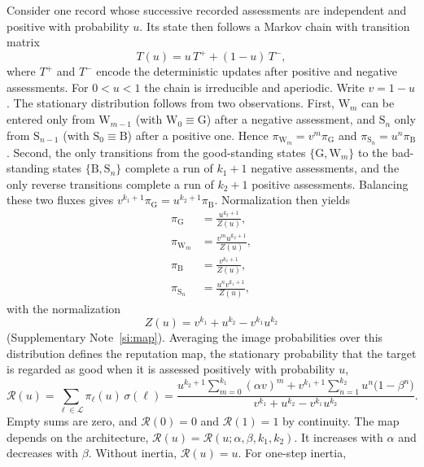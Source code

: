 \documentclass[10pt]{wlscirep}
\newcommand{\Rmap}{\mathscr{R}}            %
\newcommand{\Lspace}{\mathscr{L}}          %
\newcommand{\st}[1]{\mathrm{#1}}           %
\theoremstyle{plain}
\theoremstyle{remark}
\begin{document}
Consider one record whose successive recorded assessments are independent and positive with probability $u$. Its state then follows a Markov chain with transition matrix
\begin{equation}
T(u)=u\,T^{+}+(1-u)\,T^{-},
\label{eq:m-chain}
\end{equation}
where $T^+$ and $T^-$ encode the deterministic updates after positive and negative assessments. For $0<u<1$ the chain is irreducible and aperiodic. Write $v=1-u$. The stationary distribution follows from two observations. First, $\st W_m$ can be entered only from $\st W_{m-1}$ (with $\st W_0\equiv\st G$) after a negative assessment, and $\st S_n$ only from $\st S_{n-1}$ (with $\st S_0\equiv\st B$) after a positive one. Hence $\pi_{\st W_m}=v^m\pi_{\st G}$ and $\pi_{\st S_n}=u^n\pi_{\st B}$. Second, the only transitions from the good-standing states $\{\st G,\st W_m\}$ to the bad-standing states $\{\st B,\st S_n\}$ complete a run of $k_1+1$ negative assessments, and the only reverse transitions complete a run of $k_2+1$ positive assessments. Balancing these two fluxes gives $v^{k_1+1}\pi_{\st G}=u^{k_2+1}\pi_{\st B}$. Normalization then yields
\begin{equation}
\begin{aligned}
\pi_{\st G}&=\frac{u^{k_2+1}}{Z(u)},\\[2pt]
\pi_{\st W_m}&=\frac{v^{m}u^{k_2+1}}{Z(u)},\\[2pt]
\pi_{\st B}&=\frac{v^{k_1+1}}{Z(u)},\\[2pt]
\pi_{\st S_n}&=\frac{u^{n}v^{k_1+1}}{Z(u)},
\end{aligned}
\label{eq:m-stationary}
\end{equation}
with the normalization
\begin{equation}
Z(u)=v^{k_1}+u^{k_2}-v^{k_1}u^{k_2}
\label{eq:m-Z}
\end{equation}
(Supplementary Note~\ref{si:map}). Averaging the image probabilities over this distribution defines the reputation map, the stationary probability that the target is regarded as good when it is assessed positively with probability $u$,
\begin{equation}
\Rmap(u)=\sum_{\ell\in\Lspace}\pi_\ell(u)\,\sigma(\ell)
=\frac{u^{k_2+1}\sum_{m=0}^{k_1}(\alpha v)^m+v^{k_1+1}\sum_{n=1}^{k_2}u^n\bigl(1-\beta^n\bigr)}{v^{k_1}+u^{k_2}-v^{k_1}u^{k_2}}.
\label{eq:m-map}
\end{equation}
Empty sums are zero, and $\Rmap(0)=0$ and $\Rmap(1)=1$ by continuity. The map depends on the architecture, $\Rmap(u)=\Rmap(u;\alpha,\beta,k_1,k_2)$. It increases with $\alpha$ and decreases with $\beta$. Without inertia, $\Rmap(u)=u$. For one-step inertia,
\end{document}
